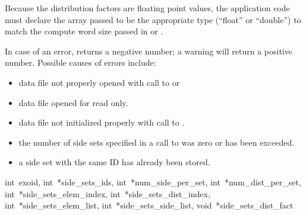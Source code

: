 Because the distribution factors are floating point values, the
application code must declare the array passed to be the appropriate
type (``float'' or ``double'') to match the compute word size passed
in  or .

In case of an error,  returns a
negative number; a warning will return a positive number.  Possible
causes of errors include:

\begin{itemize}
 \item data file not properly opened with call to 
 or 

 \item data file opened for read only.

 \item data file not initialized properly with call to
 .

 \item the number of side sets specified in a call to
  was zero or has been exceeded.

 \item a side set with the same ID has already been stored.
\end{itemize}

{int~exoid,
int~*side_sets_ids,
int~*num_side_per_set,
int~*num_dist_per_set,
int~*side_sets_elem_index,
int~*side_sets_dist_index,
int~*side_sets_elem_list,
int~*side_sets_side_list,
void~*side_sets_dist_fact}

